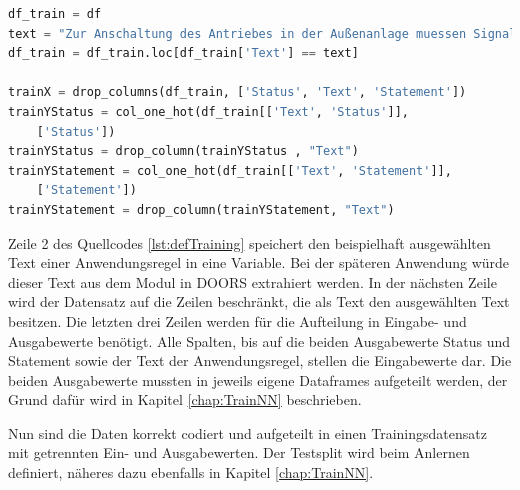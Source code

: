 \begin{lstlisting}[language = python, caption={Definieren des Trainingsdatensatzes},captionpos=b, label = lst:defTraining, floatplacement=H]
df_train = df
text = "Zur Anschaltung des Antriebes in der Außenanlage muessen Signalkabel nach VDE 0816/2 oder Kabel mit vergleichbaren Eigenschaften verwendet werden. Die Verlegevorschriften des Kabels sind einzuhalten."
df_train = df_train.loc[df_train['Text'] == text]

trainX = drop_columns(df_train, ['Status', 'Text', 'Statement'])
trainYStatus = col_one_hot(df_train[['Text', 'Status']], 
    ['Status'])
trainYStatus = drop_column(trainYStatus , "Text")
trainYStatement = col_one_hot(df_train[['Text', 'Statement']], 
    ['Statement'])
trainYStatement = drop_column(trainYStatement, "Text")
\end{lstlisting}

Zeile 2 des Quellcodes \ref*{lst:defTraining} speichert den beispielhaft ausgewählten Text einer Anwendungsregel in eine Variable. Bei der späteren Anwendung würde dieser Text
aus dem Modul in \ac{DOORS} extrahiert werden. In der nächsten Zeile wird der Datensatz auf die Zeilen beschränkt, die als Text den ausgewählten Text besitzen.
Die letzten drei Zeilen werden für die Aufteilung in Eingabe- und Ausgabewerte benötigt. Alle Spalten, bis auf die beiden Ausgabewerte \glqq Status\grqq{} und 
\glqq Statement\grqq{} sowie der Text der Anwendungsregel, stellen die Eingabewerte dar. Die beiden Ausgabewerte mussten in jeweils eigene Dataframes aufgeteilt werden, 
der Grund dafür wird in Kapitel \ref*{chap:TrainNN} beschrieben.

Nun sind die Daten korrekt codiert und aufgeteilt in einen Trainingsdatensatz mit getrennten Ein- und Ausgabewerten. Der Testsplit wird beim Anlernen definiert, näheres dazu ebenfalls in 
Kapitel \ref*{chap:TrainNN}.